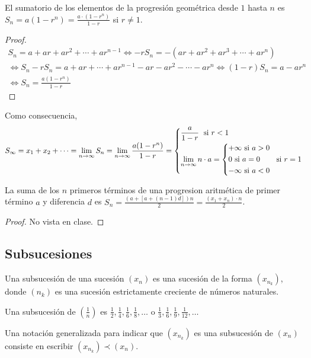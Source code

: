 \begin{proposition}
	El sumatorio de los elementos de la progresión geométrica desde \(1 \) hasta \(n \) es \(S_n = a(1 - r^{n }) = \frac{a \cdot (1-r^{n } )}{1 - r }\) si \(r \neq  1 \).
\end{proposition}
\begin{proof}
	\begin{multline*}
		S_n = a + ar + ar^{2} + \cdots + ar^{n-1} \iff  -rS_n = -(ar + ar^{2} + ar^{3} + \cdots + ar^{n}) \\
		\iff S_n - rS_n = a + ar + \cdots + ar^{n-1} - ar - ar^{2} - \cdots - ar^{n} \iff  (1 - r) S_n = a - ar^{n} \\ \iff S_n = \frac{a(1 - r^{n})}{1 - r}
	\end{multline*}
\end{proof}
Como consecuencia,
\[
	S_\infty = x_1 + x_2 + \cdots = \lim\limits_{n \to \infty} S_n = \lim\limits_{n \to \infty} \frac{a(1-r^{n} ) }{1 - r} = \begin{dcases}
		\frac{a }{1-r } \; \text{ si } r < 1 \\
		\lim\limits_{n \to \infty} n \cdot a = \begin{dcases}
			                                       +\infty \text{ si } a > 0 \\
			                                       0 \text{ si } a = 0       \\
			                                       -\infty \text{ si } a < 0 \\
		                                       \end{dcases} \; \text{ si } r = 1
	\end{dcases}
\]

\begin{proposition}
	La suma de los \(n \) primeros términos de una progresion aritmética de primer término \(a \) y diferencia \(d \) es \(S_n = \frac{(a + [a + (n-1)d])n}{2} = \frac{(x_1 + x_n)\cdot n}{2}\).
\end{proposition}
\begin{proof}
	No vista en clase.
\end{proof}

\subsection{Subsucesiones}
\begin{definition}
	Una subsucesión de una sucesión \((x_n )\) es una sucesión de la forma \((x_{n_k})\), donde \((n_k )\) es una sucesión estrictamente creciente de números naturales.
\end{definition}
\begin{example}
	Una subsucesión de \((\frac{1}{n })\) es \(\frac{1}{2}, \frac{1}{4}, \frac{1}{6}, \frac{1}{8}, \ldots \) o \(\frac{1}{3}, \frac{1}{6}, \frac{1}{9}, \frac{1}{12}, \ldots \)
\end{example}
Una notación generalizada para indicar que \((x_{n_k })\) es una subsucesión de \((x_n )\) consiste en escribir \((x_{n_k}) \prec (x_n)\).

